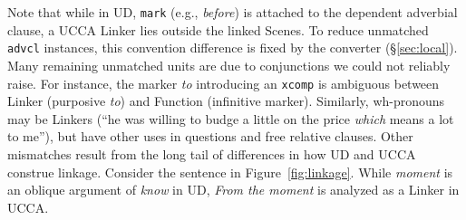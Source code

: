 \documentclass[11pt,a4paper]{article}
\begin{document}
Note that while in UD, \texttt{mark} (e.g., \textit{before})
is attached to the dependent adverbial clause,
a UCCA Linker lies outside the linked Scenes.
To reduce unmatched \texttt{advcl} instances,
this convention difference is fixed by the converter
(\S\ref{sec:local}).
Many remaining unmatched units are due to conjunctions we could not reliably raise.
For instance, the marker \textit{to} introducing an \texttt{xcomp} is ambiguous between Linker
(purposive \textit{to}) and Function (infinitive marker).
Similarly, wh-pronouns may be Linkers
(``he was willing to budge a little on the price {\it which} means a lot to me''),
but have other uses in questions and free relative clauses.
Other mismatches result from the long tail of differences in how UD and UCCA construe linkage.
Consider the sentence in Figure~\ref{fig:linkage}.
While \textit{moment} is an oblique argument of \textit{know} in UD,
\textit{From the moment} is analyzed as a Linker in UCCA.
\end{document}
